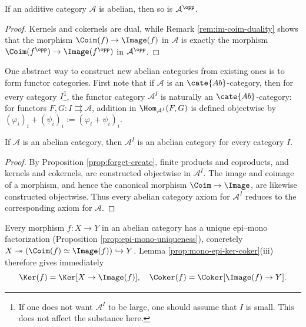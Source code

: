 \begin{proposition}\label{prop:abelian-cat-duality}
	If an additive category $\mathcal{A}$ is abelian, then so is
	$\mathcal{A}^{\opp}$.
\end{proposition}
\begin{proof}
	Kernels and cokernels are dual, while Remark \ref{rem:im-coim-duality}
	shows that the morphism $\Coim(f)\to\Image(f)$ in $\mathcal{A}$ is exactly
	the morphism $\Coim(f^{\opp})\to\Image(f^{\opp})$ in
	$\mathcal{A}^{\opp}$.
\end{proof}

One abstract way to construct new abelian categories from existing ones is to
form functor categories. First note that if $\mathcal{A}$ is an
$\cate{Ab}$-category, then for every category $I$\footnote{If one does not
want $\mathcal{A}^I$ to be large, one should assume that $I$ is small. This
does not affect the substance here.}, the functor category $\mathcal{A}^I$ is
naturally an $\cate{Ab}$-category: for functors
$F,G:I\rightrightarrows\mathcal{A}$, addition in
$\Hom_{\mathcal{A}^I}(F,G)$ is defined objectwise by
$(\varphi_i)_i+(\psi_i)_i:=(\varphi_i+\psi_i)_i$.

\begin{proposition}\label{prop:functor-cat-Abel}
	If $\mathcal{A}$ is an abelian category, then $\mathcal{A}^I$ is an
	abelian category for every category $I$.
\end{proposition}
\begin{proof}
	By Proposition \ref{prop:forget-create}, finite products and coproducts,
	and kernels and cokernels, are constructed objectwise in $\mathcal{A}^I$.
	The image and coimage of a morphism, and hence the canonical morphism
	$\Coim\to\Image$, are likewise constructed objectwise. Thus every abelian
	category axiom for $\mathcal{A}^I$ reduces to the corresponding axiom for
	$\mathcal{A}$.
\end{proof}

Every morphism $f:X\to Y$ in an abelian category has a unique epi--mono
factorization (Proposition \ref{prop:epi-mono-uniqueness}), concretely
$X\twoheadrightarrow(\Coim(f)\simeq\Image(f))\hookrightarrow Y$. Lemma
\ref{prop:mono-epi-ker-coker}(iii) therefore gives immediately
\[ \Ker(f) = \Ker[X \to \Image(f)], \quad \Coker(f) = \Coker[\Image(f) \to Y]. \]

